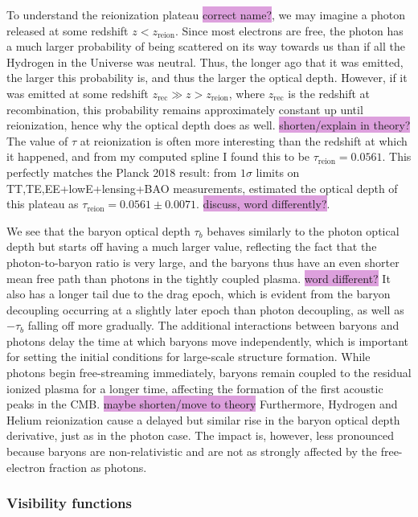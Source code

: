 \documentclass{aa}
\begin{document}
To understand the reionization plateau \colorbox{Plum}{correct name?}, we may imagine a photon released at some redshift $z<z_\text{reion}$. Since most electrons are free, the photon has a much larger probability of being scattered on its way towards us than if all the Hydrogen in the Universe was neutral. Thus, the longer ago that it was emitted, the larger this probability is, and thus the larger the optical depth. However, if it was emitted at some redshift $z_\text{rec}\gg z>z_\text{reion}$, where $z_\text{rec}$ is the redshift at recombination, this probability remains approximately constant up until reionization, hence why the optical depth does as well. \colorbox{Plum}{shorten/explain in theory?} The value of $\tau$ at reionization is often more interesting than the redshift at which it happened, and from my computed spline I found this to be  $\tau_\text{reion} = 0.0561$. This perfectly matches the Planck 2018 result: from $1\sigma$ limits on TT,TE,EE+lowE+lensing+BAO measurements, \cite{Planck} estimated the optical depth of this plateau as $\tau_\text{reion}=0.0561\pm0.0071$. \colorbox{Plum}{discuss, word differently?}. 

We see that the baryon optical depth $\tau_b$ behaves similarly to the photon optical depth but starts off having a much larger value, reflecting the fact that the photon-to-baryon ratio is very large, and the baryons thus have an even shorter mean free path than photons in the tightly coupled plasma. \colorbox{Plum}{word different?} It also has a longer tail due to the drag epoch, which is evident from the baryon decoupling occurring at a slightly later epoch than photon decoupling, as well as $-\tau_b$ falling off more gradually. The additional interactions between baryons and photons delay the time at which baryons move independently, which is important for setting the initial conditions for large-scale structure formation. While photons begin free-streaming immediately, baryons remain coupled to the residual ionized plasma for a longer time, affecting the formation of the first acoustic peaks in the CMB. \colorbox{Plum}{maybe shorten/move to theory} Furthermore, Hydrogen and Helium reionization cause a delayed but similar rise in the baryon optical depth derivative, just as in the photon case. The impact is, however, less pronounced because baryons are non-relativistic and are not as strongly affected by the free-electron fraction as photons.


\subsubsection{Visibility functions}
\end{document}

